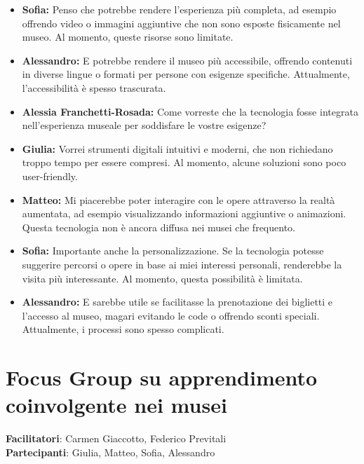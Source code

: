 \documentclass{article}
\begin{document}
\begin{itemize}
    \item \textbf{Sofia:} Penso che potrebbe rendere l’esperienza più completa, ad esempio offrendo video o immagini aggiuntive che non sono esposte fisicamente nel museo. Al momento, queste risorse sono limitate.
    
    \item \textbf{Alessandro:} E potrebbe rendere il museo più accessibile, offrendo contenuti in diverse lingue o formati per persone con esigenze specifiche. Attualmente, l’accessibilità è spesso trascurata.
    
    \item \textbf{Alessia Franchetti-Rosada:} Come vorreste che la tecnologia fosse integrata nell’esperienza museale per soddisfare le vostre esigenze?
    
    \item \textbf{Giulia:} Vorrei strumenti digitali intuitivi e moderni, che non richiedano troppo tempo per essere compresi. Al momento, alcune soluzioni sono poco user-friendly.
    
    \item \textbf{Matteo:} Mi piacerebbe poter interagire con le opere attraverso la realtà aumentata, ad esempio visualizzando informazioni aggiuntive o animazioni. Questa tecnologia non è ancora diffusa nei musei che frequento.
    
    \item \textbf{Sofia:} Importante anche la personalizzazione. Se la tecnologia potesse suggerire percorsi o opere in base ai miei interessi personali, renderebbe la visita più interessante. Al momento, questa possibilità è limitata.
    
    \item \textbf{Alessandro:} E sarebbe utile se facilitasse la prenotazione dei biglietti e l’accesso al museo, magari evitando le code o offrendo sconti speciali. Attualmente, i processi sono spesso complicati.

\end{itemize}

\section{Focus Group su apprendimento coinvolgente nei musei}
\textbf{Facilitatori}: Carmen Giaccotto, Federico Previtali \\
\textbf{Partecipanti}: Giulia, Matteo, Sofia, Alessandro
\end{document}
